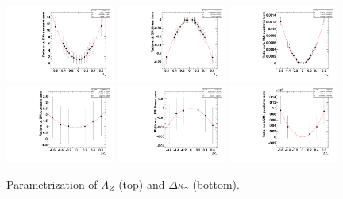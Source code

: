 \begin{figure}[h!t]
  {\centering
    \includegraphics[width=0.32\textwidth]{figs/graphLambdaZP0.pdf}
    \includegraphics[width=0.32\textwidth]{figs/graphLambdaZP1.pdf}
    \includegraphics[width=0.32\textwidth]{figs/graphLambdaZP2.pdf}
    \includegraphics[width=0.32\textwidth]{figs/graphKappaGP0.pdf}
    \includegraphics[width=0.32\textwidth]{figs/graphKappaGP1.pdf}
    \includegraphics[width=0.32\textwidth]{figs/graphKappaGP2.pdf}
    \caption{Parametrization of $\Lambda_Z$ (top) and 
      $\Delta{\kappa_\gamma}$ (bottom).}
    \label{fig:aTGC_parametrization}}
\end{figure}


